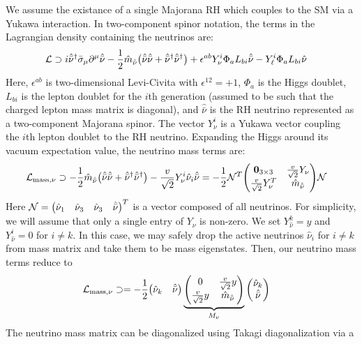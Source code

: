 \documentclass[a4paper,11pt]{article} \pdfoutput=1
\newcommand{\rhn}{\bar{\nu}}
\begin{document}
We assume the existance of a single Majorana RH which couples to the SM via a
Yukawa interaction. In two-component spinor notation, the terms in the
Lagrangian density containing the neutrinos are:
\begin{align}
	\mathcal{L}
	 & \supset
	i\hat{\rhn}^{\dagger}\bar{\sigma}_{\mu}\partial^{\mu}\hat{\rhn}
	- \frac{1}{2}\hat{m}_{\hat{\rhn}}\qty(\hat{\rhn}\hat{\rhn} + \hat{\rhn}^{\dagger}\hat{\rhn}^{\dagger})
	+ \epsilon^{ab}Y^{i}_{\nu}\Phi_{a}L_{bi}\hat{\rhn}
	- Y^{i}_{\ell}\Phi_{a}L_{bi}\hat{\nu}
\end{align}
Here, \(\epsilon^{ab}\) is two-dimensional Levi-Civita with \(\epsilon^{12}=+1\), \(\Phi_{a}\) is the Higgs doublet, \(L_{bi}\) is the lepton doublet for
the \(i\)th generation (assumed to be such that the charged lepton mass matrix is diagonal),
and \(\hat{\rhn}\) is the RH neutrino represented as a two-component
Majorana spinor. The vector \(Y^{i}_{\nu}\) is a Yukawa vector coupling the
\(i\)th lepton doublet to the RH neutrino. Expanding the Higgs around its vacuum
expectation value, the neutrino mass terms are:
\begin{align}
	\mathcal{L}_{\mathrm{mass},\nu}
	                        & \supset
	- \frac{1}{2}\hat{m}_{\hat{\rhn}}\qty(\hat{\rhn}\hat{\rhn} + \hat{\rhn}^{\dagger}\hat{\rhn}^{\dagger})
	- \frac{v}{\sqrt{2}}Y^{i}_{\nu}\hat{\nu}_{i}\hat{\rhn}
	=
	-\frac{1}{2}
	\mathcal{N}^{T}
	\mqty(\bm{0}_{3\times3} & \frac{v}{\sqrt{2}}Y_{\nu} \\ \frac{v}{\sqrt{2}}Y^{T}_{\nu} & \hat{m}_{\hat{\rhn}})
	\mathcal{N}
\end{align}
Here \(\mathcal{N} = \mqty(\hat{\nu}_1 & \hat{\nu}_3 &\hat{\nu}_3&\hat{\rhn})^{T}\)
is a vector composed of all neutrinos. For simplicity, we will assume that only
a single entry of \(Y_{\nu}\) is non-zero. We set \(Y^{k}_{\hat{\nu}} = y\)
and \(Y^{i}_{\hat{\nu}} = 0\) for \(i\neq k\). In this case, we may safely drop
the active neutrinos \(\hat{\nu}_{i}\) for \(i\neq k\) from mass matrix and
take them to be mass eigenstates. Then, our neutrino mass terms reduce to
\begin{align}
	\mathcal{L}_{\mathrm{mass},\nu}
	                    & \supset
	=
	-\frac{1}{2}
	\mqty(\hat{\nu}_{k} & \hat{\rhn})
	\underbrace{\mqty(0 & \frac{v}{\sqrt{2}}y \\ \frac{v}{\sqrt{2}}y & \hat{m}_{\hat{\rhn}})}_{M_{\nu}}
	\mqty(\hat{\nu}_{k}                       \\ \hat{\rhn})
\end{align}
The neutrino mass matrix can be diagonalized using Takagi diagonalization via a
\end{document}
